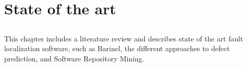 \chapter{State of the art} \label{chap:sota}

\section*{}

This chapter includes a literature review and describes state of the art fault localization software, such as Barinel, the different approaches to defect prediction, and Software Repository Mining.



